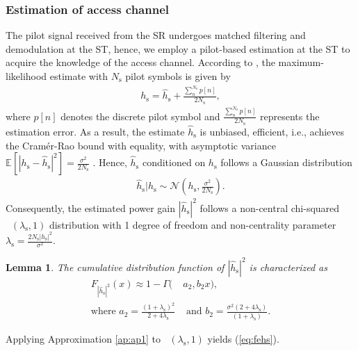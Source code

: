 \documentclass[letterpaper, twocolumn]{IEEEtran}
\newcommand{\e}[2]{{\mathbb E}_{#1}\left[ #2 \right]}
\newcommand{\p}{\mathbb P}
\newcommand{\sub}[1]{_{\text{#1}}}
\newcommand{\op}{\text{P}\sub{out}}
\newcommand{\opc}{\rho\sub{out}}
\newcommand{\preg}{P\sub{cont}}
\newcommand{\pp}{P\sub{p}}
\newcommand{\ite}{\theta\sub{I}}
\newcommand{\gp}{h\sub{p}}
\newcommand{\epgs}{|\hat{h}\sub{s}|^2}
\newcommand{\gs}{h\sub{s}}
\newcommand{\egs}{\hat{h}\sub{s}}
\newcommand{\nps}{\sigma^2}
\newcommand{\fgs}{F_{\epgs}}
\newcommand{\ls}{\lambda\sub{s}}
\newcommand{\Ks}{N\sub{s}}
\DeclareMathOperator*{\ncchi}{\mathcal{X}_1^2}
\newtheorem{lemma}{Lemma}
\begin{document}
\subsubsection{Estimation of access channel}
The pilot signal received from the SR undergoes matched filtering and demodulation at the ST, hence, we employ a pilot-based estimation at the ST to acquire the knowledge of the access channel. According to \cite{Gifford08}, the maximum-likelihood estimate with $\Ks$ pilot symbols is given by 
\begin{align}
\gs = \egs + \frac{\sum^{\Ks}_{n} p[n]}{2 \Ks},
\label{eq:pilot_MLE}
\end{align}
where $p[n]$ denotes the discrete pilot symbol and $\frac{\sum^{\Ks}_{n} p[n]}{2 \Ks}$ represents the estimation error.
As a result, the estimate $\egs$ is unbiased, efficient, i.e., achieves the Cram\'er-Rao bound with equality, with asymptotic variance $\e{}{|\gs -\egs|^2} = \frac{\nps}{2 \Ks}$ \cite{Gifford08}. Hence, $\egs$ conditioned on $\gs$ follows a Gaussian distribution
\begin{align}
\egs|\gs \sim \mathcal{N}\left( \gs,\frac{\nps}{2 \Ks} \right).
\label{eq:ehs} 
\end{align}
Consequently, the estimated power gain $|\egs|^2$ follows a non-central chi-squared $\ncchi(\ls, 1)$ distribution with 1 degree of freedom and non-centrality parameter $\ls = \frac{2 \Ks |\gs|^2}{\nps}$. 
\begin{lemma} \label{lm:lm2}
The cumulative distribution function of $\epgs$ is characterized as 
\begin{align}
\fgs(x) \approx 1 - \Gamma(&a_2, b_2 x) \label{eq:fehs},\\ 
\text{where  } a_2 = \frac{(1 + \ls)^2}{2 + 4 \ls} &\text{ and } b_2 = \frac{\nps (2 + 4 \ls)}{(1 + \ls)}.  \nonumber 
\end{align} 
\end{lemma}
\begin{IEEEproof}
Applying Approximation \ref{ap:ap1} to $\ncchi(\ls,1 )$ yields (\ref{eq:fehs}). 
\end{IEEEproof}
\end{document}
